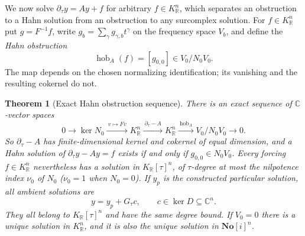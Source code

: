 \documentclass[11pt,letterpaper]{article}
\numberwithin{equation}{section}
\newtheorem{theorem}{Theorem}[section]
\theoremstyle{definition}
\theoremstyle{remark}
\newcommand{\SC}{\mathbf{No}[i]}
\newcommand{\R}{\mathbb R}
\newcommand{\C}{\mathbb C}
\newcommand{\der}{\partial}
\newcommand{\Ker}{\operatorname{ker}}
\newcommand{\derT}{\der_{\tau}}
\newcommand{\KR}{K_{\R}}
\newcommand{\hob}{\operatorname{hob}}
\begin{document}
We now solve $\derT y=Ay+f$ for arbitrary $f\in\KR^{n}$, which separates an
obstruction to a Hahn solution from an obstruction to any surcomplex solution.
For $f\in\KR^{n}$ put $g=F^{-1}f$, write $g_{b}=\sum_{\gamma}g_{\gamma,b}t^{\gamma}$
on the frequency space $V_{b}$, and define the \emph{Hahn obstruction}
\begin{equation}\label{diff:rs:eq:hob}
 \hob_{A}(f)=[g_{0,0}]\in V_{0}/N_{0}V_{0}.
\end{equation}
The map depends on the chosen normalizing identification; its vanishing and the
resulting cokernel do not.

\begin{theorem}[Exact Hahn obstruction sequence]
\label{diff:rs:thm:forced}
There is an exact sequence of $\C$-vector spaces
\begin{equation}\label{diff:rs:eq:exact}
 0\longrightarrow\Ker N_{0}
 \xrightarrow{\ v\mapsto Fv\ }\KR^{n}
 \xrightarrow{\ \derT-A\ }\KR^{n}
 \xrightarrow{\ \hob_{A}\ }V_{0}/N_{0}V_{0}
 \longrightarrow0 .
\end{equation}
So $\derT-A$ has finite-dimensional kernel and cokernel of equal dimension, and
a Hahn solution of $\derT y-Ay=f$ exists if and only if $g_{0,0}\in N_{0}V_{0}$.
Every forcing $f\in\KR^{n}$ nevertheless has a solution in $\KR[\tau]^{n}$, of
$\tau$-degree at most the nilpotence index $\nu_{0}$ of $N_{0}$ ($\nu_{0}=1$ when
$N_{0}=0$). If $y_p$ is the constructed particular solution, all ambient
solutions are
\[
 y=y_p+G_\tau c,\qquad c\in\Ker D\subseteq\C^n.
\]
They all belong to $\KR[\tau]^n$ and have the same degree bound.
If $V_{0}=0$ there is a unique solution in $\KR^{n}$, and it is also
the unique solution in $\SC^{n}$.
\end{theorem}
\end{document}
